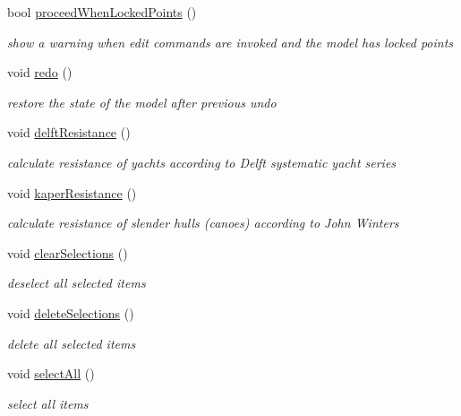\begin{DoxyCompactItemize}
bool \hyperlink{classShipCAD_1_1Controller_a2b2d3d9fbd9fd115ae8e80fa57930277}{proceed\-When\-Locked\-Points} ()
\begin{DoxyCompactList}\small\item\em show a warning when edit commands are invoked and the model has locked points \end{DoxyCompactList}\item 
void \hyperlink{classShipCAD_1_1Controller_aeb55fe16b48f14b00c179e95a0372a17}{redo} ()
\begin{DoxyCompactList}\small\item\em restore the state of the model after previous undo \end{DoxyCompactList}\item 
void \hyperlink{classShipCAD_1_1Controller_a6809e5172d21a2bdd439317e533d9c0b}{delft\-Resistance} ()
\begin{DoxyCompactList}\small\item\em calculate resistance of yachts according to Delft systematic yacht series \end{DoxyCompactList}\item 
void \hyperlink{classShipCAD_1_1Controller_ad4335a4380f34eace0a0aa6a3a4abdf5}{kaper\-Resistance} ()
\begin{DoxyCompactList}\small\item\em calculate resistance of slender hulls (canoes) according to John Winters \end{DoxyCompactList}\item 
void \hyperlink{classShipCAD_1_1Controller_a993e2dfe6bb88cf07375e6a57d2d15a5}{clear\-Selections} ()
\begin{DoxyCompactList}\small\item\em deselect all selected items \end{DoxyCompactList}\item 
void \hyperlink{classShipCAD_1_1Controller_a07a48262bd736b3e2e3da4123b1f08a4}{delete\-Selections} ()
\begin{DoxyCompactList}\small\item\em delete all selected items \end{DoxyCompactList}\item 
void \hyperlink{classShipCAD_1_1Controller_a97a0dfdd229e0d7e0e7d5995dd9095a3}{select\-All} ()
\begin{DoxyCompactList}\small\item\em select all items \end{DoxyCompactList}\item 

\end{DoxyCompactItemize}

